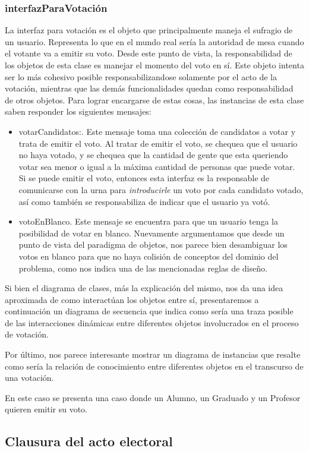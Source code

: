 \subsubsection{interfazParaVotaci\'on}

La interfaz para votaci\'on es el objeto que principalmente maneja el sufragio de un usuario. Representa lo que en el mundo real ser\'ia la autoridad de mesa cuando el votante va a emitir su voto. Desde este punto de vista, la responsabilidad de los objetos de esta clase es manejar el momento del voto en s\'i. Este objeto intenta ser lo m\'as cohesivo posible responsabilizandose solamente por el acto de la votaci\'on, mientras que las dem\'as funcionalidades quedan como responsabilidad de otros objetos. Para lograr encargarse de estas cosas, las instancias de esta clase saben responder los siguientes mensajes:

\begin{itemize}
\item votarCandidatos:. Este mensaje toma una colecci\'on de candidatos a votar y trata de emitir el voto. Al tratar de emitir el voto, se chequea que el usuario no haya votado, y se chequea que la cantidad de gente que esta queriendo votar sea menor o igual a la m\'axima cantidad de personas que puede votar. Si se puede emitir el voto, entonces esta interfaz es la responsable de comunicarse con la urna para \emph{introducirle} un voto por cada candidato votado, as\'i como tambi\'en se responsabiliza de indicar que el usuario ya vot\'o.
\item votoEnBlanco. Este mensaje se encuentra para que un usuario tenga la posibilidad de votar en blanco. Nuevamente argumentamos que desde un punto de vista del paradigma de objetos, nos parece bien desambiguar los votos en blanco para que no haya colisi\'on de conceptos del dominio del problema, como nos indica una de las mencionadas reglas de dise\~{n}o.
\end{itemize}




\bigskip

Si bien el diagrama de clases, m\'as la explicaci\'on del mismo, nos da una idea aproximada de como interact\'uan los objetos entre s\'i, presentaremos a continuaci\'on un diagrama de secuencia que indica como ser\'ia una traza posible de las interacciones din\'amicas entre diferentes objetos involucrados en el proceso de votaci\'on.


\bigskip

Por \'ultimo, nos parece interesante mostrar un diagrama de instancias que resalte como ser\'ia la relaci\'on de conocimiento entre diferentes objetos en el transcurso de una votaci\'on.

En este caso se presenta una caso donde un Alumno, un Graduado y un Profesor quieren emitir su voto.




\subsection{Clausura del acto electoral}


